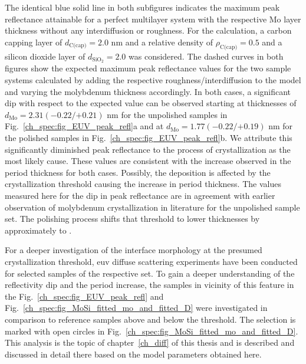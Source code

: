 The identical blue solid line in both subfigures indicates the maximum peak reflectance attainable for a perfect multilayer system with the respective Mo layer thickness without any interdiffusion or roughness. For the calculation, a carbon capping layer of $d_\text{C(cap)} = 2.0$ nm and a relative density of $\rho_\text{C(cap)} = 0.5$ and a silicon dioxide layer of $d_\text{SiO$_2$} = 2.0$ was considered. The dashed curves in both figures show the expected maximum peak reflectance values for the two sample systems calculated by adding the respective roughness/interdiffusion to the model and varying the molybdenum thickness accordingly. In both cases, a significant dip with respect to the expected value can be observed starting at thicknesses of $d_\text{Mo} = 2.31({-0.22}/{+0.21})$ nm for the unpolished samples in Fig.~\ref{ch_spec:fig_EUV_peak_refl}a and at $d_\text{Mo} = 1.77({-0.22}/{+0.19})$ nm for the polished samples in Fig.~\ref{ch_spec:fig_EUV_peak_refl}b. We attribute this significantly diminished peak reflectance to the process of crystallization as the most likely cause. These values are consistent with the increase observed in the period thickness for both cases. Possibly, the deposition is affected by the crystallization threshold causing the increase in period thickness. The values measured here for the dip in peak reflectance are in agreement with earlier observation of molybdenum crystallization in literature \cite{bajt_investigation_2001} for the unpolished sample set. The polishing process shifts that threshold to lower thicknesses by approximately  to .

For a deeper investigation of the interface morphology at the presumed crystallization threshold, \gls{euv} diffuse scattering experiments have been conducted for selected samples of the respective set. To gain a deeper understanding of the reflectivity dip and the period increase, the samples in vicinity of this feature in the Fig.~\ref{ch_spec:fig_EUV_peak_refl} and Fig.~\ref{ch_spec:fig_MoSi_fitted_mo_and_fitted_D} were investigated in comparison to reference samples above and below the threshold. The selection is marked with open circles in Fig.~\ref{ch_spec:fig_MoSi_fitted_mo_and_fitted_D}. This analysis is the topic of chapter~\ref{ch_diff} of this thesis and is described and discussed in detail there based on the model parameters obtained here.

 





